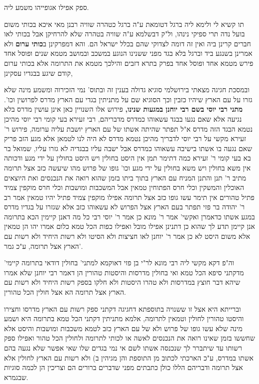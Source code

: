 \documentclass[12pt, openany]{book}
\begin{document}
{{ספק אפילו אגופייהו משמע ליה.\par תו קשיא לי ולימא ליה ברגל דטומאת ע"ה ברגל כטהרה שוויה רבנן מאי איכא בכותי משום בועל נדה תרי ספיקי נינהו, ול"ק דבשלמא ע"ה שוויה בטהרה שלא להרחיקן אבל בכותי לאו חברים קרינן ביה ואין זה דומה לצדוקי שהם בכלל ישראל הם. 
והא דמפרקינן ב\textbf{כותי ערום} ולא אמרינן בשנגע ביד וברגל בלא בגד מפני ששנינו הנוגע במשכב ובמושב מטמא שנים ופוסל אחד פירש מטמא אחד ופוסל אחד בפרק בתרא דזבים והילכך מטמא את התרומה אלא בכותי ערום קודם שיגע בבגדיו עסקינן,\par ובמסכת חגיגה מצאתי בירושלמי סוגיא גדולה בענין זה ובתוס' נמי הזכירוה ומשמע מינה שלא גזרו על עם הארץ שיהיו כזבין וכך הסוגיא שם על מתניתין בגדי עם הארץ מדרס לפרושין וכו'. 
\textbf{מתני רבי יוסי בשם רבי יוחנן במגעות שנינו,} פירוש אלו השנויין כאן אינן עושין מדרס בלא נגיעה אלא שאם נגעו בבגד עשאוהו כמדרס מדבריהם, רבי זעירא בעי קומי רבי יוסי מהיכן נטמא הבגד הזה מדרס א"ל תפתר שהיתה אשתו של עם הארץ יושבת עליה ערומה, פירוש ר' זעירא מקשי על רבי יוסי לדבריך מהיכן נטמא מדרס לא היה לנו לטמאן אלא מגע הזב פריק שאם נגעה בו אשתו בישיבה עשאוהו כמדרס אבל ישבה עליו בבגדיה לא גזרו עליו, שמואל בר בא בעי קומי ר' זעירא כמה דתימר תמן אין היסט בחולין ויש היסט בחולין על ידי מגע ודכותה אין משא בחולין ויש משא בחולין על ידי מגע וכו' גופו של פרוש מהו שיעשה כזב אצל תרומה מתיב ר' תנן והתנן המניח עם הארץ בתוך ביתו בזמן שהוא רואה את הנכנסים ואת היוצאים האוכלין והמשקין וכלי חרס הפתוחין טמאין אבל המשכבות ומושבות וכלי חרס מוקפין צמיד פתיל טהורים אין תימר עשו גופו כזב אצל תרומה אפילו מוקפין צמיד פתיל יהיו טמאין אמר רב ר' יהודה בר פזי תפתר בעם הארץ אצל הפרוש לא עשאוהו כזב אלא שגזרו על בגדיו מדרס במגע אשתו כדאמרן ואקשי' אמר ר' מונא כן אמר ר' יוסי רבי כל מה דאנן קיימין הכא בתרומה אנן קיימן תדע לך שהוא כן דתנינן אפילו מובל ואפילו כפות הכל טמא כלום אמרו יהו הן טמאין אלא משום היסט לא כן אמר ר' יוחנן לאו חציצות ולא הסיטו ולא רשות היחיד ולא רשות עם הארץ אצל תרומה, ע"כ גמר'.\par וה"פ דקא מקשי ליה רבי מונא לר"י בן פזי דאוקמא למתני' בחולין דודאי בתרומה קיימי' מדקתני סיפא הכל טמא ואי בחולין מדרסות והיסטות טהורין הן דאמר רבי יוחנן שלא אמרו שיהא דבר חוצץ במדרסות ולא טהרו היסטות ולא חלקו בספק רשות היחיד ולא רשות עם הארץ אצל תרומה הא אצל חולין הכל טהורין.\par וברייתא היא אצל זו ששנויה בתוספתא דחגיגה דקתני ספק רשות עם הארץ מדרסו וחצירו והיסטו טהורין לחולין וטמאין לתרומה, אלמא מתניתין דקתני הכל טמא בתרומה היא ושמע מינה שלא עשו גופו של פרוש ולא של עם הארץ כזב לטמא משכבות ומושבות והיסט אלא שחששו בזמן שאינו רואה את הנכנסים לאשה או לכותי לתרומה ולחולין הכל טהור ואפילו ספק רשותו עד שיתברר לך שנכנסה אשתו לשם אי נמי בגדים שלו שאי אפשר שלא נגעה בהם אשתו במדרס, ע"כ הארכתי לכתוב מן התוספת והן מגיהין ב) ולא רשות עם הארץ לחולין אלא אצל תרומה ודבריהם הללו כולן כתבתים מפני שדברים ברורים הם וצריכין הן לכמה סוגיות שבגמרא. 
}}
\end{document}
